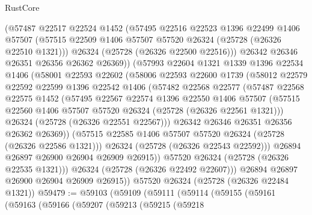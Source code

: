 \begin{lexlean}{RustCore}
\begin{coremodule}
            (@57487
              @22517
              @22524
              @1452
              (@57495
                @22516
                @22523
                @1396
                @22499
                @1406
                @57507
                (@57515 @22509 @1406 @57507 @57520 @26324 (@25728 (@26326 @22510 @1321)))
                @26324
                (@25728 (@26326 @22500 @22516)))
              @26342
              @26346
              @26351
              @26356
              @26362
              @26369))
          (@57993
            @22604
            @1321
            @1339
            @1396
            @22534
            @1406
            (@58001
              @22593
              @22602
              (@58006
                @22593
                @22600
                @1739
                (@58012
                  @22579
                  @22592
                  @22599
                  @1396
                  @22542
                  @1406
                  (@57482
                    @22568
                    @22577
                    (@57487
                      @22568
                      @22575
                      @1452
                      (@57495
                        @22567
                        @22574
                        @1396
                        @22550
                        @1406
                        @57507
                        (@57515 @22560 @1406 @57507 @57520 @26324 (@25728 (@26326 @22561 @1321)))
                        @26324
                        (@25728 (@26326 @22551 @22567)))
                      @26342
                      @26346
                      @26351
                      @26356
                      @26362
                      @26369))
                  (@57515 @22585 @1406 @57507 @57520 @26324 (@25728 (@26326 @22586 @1321)))
                  @26324
                  (@25728 (@26326 @22543 @22592)))
                @26894
                @26897
                @26900
                @26904
                @26909
                @26915))
            @57520
            @26324
            (@25728 (@26326 @22535 @1321)))
          @26324
          (@25728 (@26326 @22492 @22607)))
        @26894
        @26897
        @26900
        @26904
        @26909
        @26915))
    @57520
    @26324
    (@25728 (@26326 @22484 @1321))
@59479 := @59103
    (@59109
      (@59111
        (@59114
          (@59155
            (@59161
              (@59163
                (@59166
                  (@59207
                    (@59213
                      (@59215
                        (@59218

\end{coremodule}
\end{lexlean}
